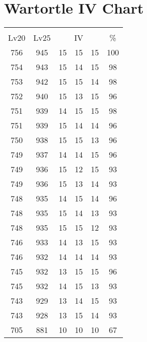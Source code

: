 \documentclass{article}%
\begin{document}
%
\normalsize%
\section{Wartortle IV Chart}%
\label{sec:Wartortle IV Chart}%
\renewcommand{\arraystretch}{1.5}%
\begin{tabular}{|c|c|c|c|c|c|}%
\hline%
\multicolumn{6}{|c|}{\textcolor{white}{ 
\linebreak{Wartortle}
}%
\cellcolor{black}}\\%
\multicolumn{1}{|c}{Lv20}&\multicolumn{1}{c|}{Lv25}&\multicolumn{3}{c|}{IV}&\multicolumn{1}{|c|}{\%}\\%
\hline%
\rowcolor{color100}%
756&945&15&15&15&100\\%
\hline%
\rowcolor{color98}%
754&943&15&14&15&98\\%
\hline%
\rowcolor{color98}%
753&942&15&15&14&98\\%
\hline%
\rowcolor{color96}%
752&940&15&13&15&96\\%
\hline%
\rowcolor{color98}%
751&939&14&15&15&98\\%
\hline%
\rowcolor{color96}%
751&939&15&14&14&96\\%
\hline%
\rowcolor{color96}%
750&938&15&15&13&96\\%
\hline%
\rowcolor{color96}%
749&937&14&14&15&96\\%
\hline%
\rowcolor{color93}%
749&936&15&12&15&93\\%
\hline%
\rowcolor{color93}%
749&936&15&13&14&93\\%
\hline%
\rowcolor{color96}%
748&935&14&15&14&96\\%
\hline%
\rowcolor{color93}%
748&935&15&14&13&93\\%
\hline%
\rowcolor{color93}%
748&935&15&15&12&93\\%
\hline%
\rowcolor{color93}%
746&933&14&13&15&93\\%
\hline%
\rowcolor{color93}%
746&932&14&14&14&93\\%
\hline%
\rowcolor{color96}%
745&932&13&15&15&96\\%
\hline%
\rowcolor{color93}%
745&932&14&15&13&93\\%
\hline%
\rowcolor{color93}%
743&929&13&14&15&93\\%
\hline%
\rowcolor{color93}%
743&928&13&15&14&93\\%
\hline%
\rowcolor{color91}%
705&881&10&10&10&67\\%
\end{tabular}

%
\end{document}
